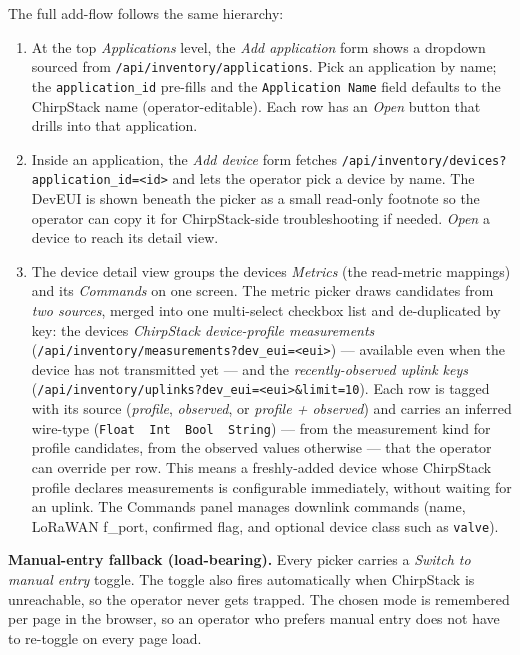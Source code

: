 The full add-flow follows the same hierarchy:

\begin{enumerate}
\def\labelenumi{\arabic{enumi}.}
\item
  At the top \emph{Applications} level, the \emph{Add application} form shows a dropdown sourced from \texttt{/api/inventory/applications}. Pick an application by name; the \texttt{application\_id} pre-fills and the \texttt{Application\ Name} field defaults to the ChirpStack name (operator-editable). Each row has an \emph{Open} button that drills into that application.
\item
  Inside an application, the \emph{Add device} form fetches \texttt{/api/inventory/devices?application\_id=\textless{}id\textgreater{}} and lets the operator pick a device by name. The DevEUI is shown beneath the picker as a small read-only footnote so the operator can copy it for ChirpStack-side troubleshooting if needed. \emph{Open} a device to reach its detail view.
\item
  The device detail view groups the device\textquotesingle s \emph{Metrics} (the read-metric mappings) and its \emph{Commands} on one screen. The metric picker draws candidates from \emph{two sources}, merged into one multi-select checkbox list and de-duplicated by key: the device\textquotesingle s \emph{ChirpStack device-profile measurements} (\texttt{/api/inventory/measurements?dev\_eui=\textless{}eui\textgreater{}}) --- available even when the device has not transmitted yet --- and the \emph{recently-observed uplink keys} (\texttt{/api/inventory/uplinks?dev\_eui=\textless{}eui\textgreater{}\&limit=10}). Each row is tagged with its source (\emph{profile}, \emph{observed}, or \emph{profile + observed}) and carries an inferred wire-type (\texttt{Float\ \textbar{}\ Int\ \textbar{}\ Bool\ \textbar{}\ String}) --- from the measurement kind for profile candidates, from the observed values otherwise --- that the operator can override per row. This means a freshly-added device whose ChirpStack profile declares measurements is configurable immediately, without waiting for an uplink. The Commands panel manages downlink commands (name, LoRaWAN f\_port, confirmed flag, and optional device class such as \texttt{valve}).
\end{enumerate}

\textbf{Manual-entry fallback (load-bearing).} Every picker carries a \emph{Switch to manual entry} toggle. The toggle also fires automatically when ChirpStack is unreachable, so the operator never gets trapped. The chosen mode is remembered per page in the browser, so an operator who prefers manual entry does not have to re-toggle on every page load.

